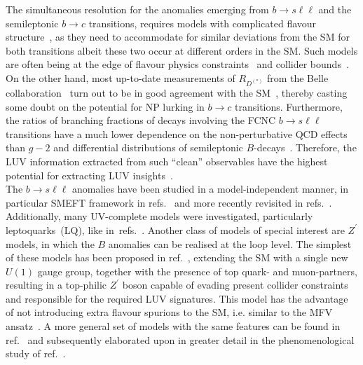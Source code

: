 The simultaneous resolution for the anomalies emerging from $ b \to s \ell \ell$ and the semileptonic $b \to c$ transitions, requires models with complicated flavour structure~\cite{DiLuzio:2017vat,Calibbi:2017qbu,Bordone:2017bld,Barbieri:2017tuq,Assad:2017iib,Heeck:2018ntp,Fornal:2018dqn,Crivellin:2018yvo,Crivellin:2019dwb,Bordone:2019uzc}, as they need to accommodate for similar deviations from the SM for both transitions albeit these two occur at different orders in the SM. Such models are often being at the edge of flavour physics constraints~\cite{Bona:2007vi,Silvestrini:2018dos} and collider bounds~\cite{Greljo:2017vvb,Baker:2019sli}.
On the other hand, most up-to-date measurements of $R_{D^{(*)}}$ from the Belle collaboration~\cite{Hirose:2016wfn,Abdesselam:2019dgh} turn out to be in good agreement with the SM~\cite{Bigi:2016mdz,Bernlochner:2017jka,Bigi:2017jbd,Jaiswal:2017rve}, thereby casting some doubt on the potential for NP lurking in $b\to c$ transitions. 
Furthermore, the ratios of branching fractions of decays involving the FCNC $b \to s \ell \ell$ transitions have a much lower dependence on the  non-perturbative QCD effects than $g-2$ and differential distributions of semileptonic $B$-decays~\cite{Capdevila:2016ivx,Serra:2016ivr,Wehle:2016yoi,Alguero:2019pjc}. Therefore, the LUV information extracted from such ``clean'' observables have the highest potential for extracting LUV insights~\cite{Kou:2018nap}.\\
The $ b \to s \ell \ell$ anomalies have been studied in a model-independent manner, in particular SMEFT framework in refs.~\cite{DAmico:2017mtc,Geng:2017svp,Capdevila:2017bsm,Ciuchini:2017mik,Hiller:2017bzc} and more recently revisited in refs.~\cite{Ciuchini:2019usw,Aebischer:2019mlg,Alok:2019ufo,Alguero:2019ptt,Kowalska:2019ley,Arbey:2019duh,Datta:2019zca}.  Additionally, many UV-complete models were investigated, particularly leptoquarks~(LQ), like in~refs.~\cite{Calibbi:2015kma,Dorsner:2016wpm,Buttazzo:2017ixm,Kumar:2018kmr,Cornella:2019hct}. Another class of models of special interest are $Z^\prime$ models, in which the $B$ anomalies can be realised at the loop level. The simplest of these models has been proposed in ref.~\cite{Kamenik:2017tnu}, extending the SM with a single new $U(1)$ gauge group, together with the presence of top quark- and muon-partners, resulting in a top-philic $Z^\prime$ boson capable of evading present collider constraints~\cite{Fox:2018ldq} and responsible for the required LUV signatures. This model has the advantage of not introducing extra flavour spurions to the SM, i.e. similar to the MFV ansatz~\cite{Buras:2000dm,DAmbrosio:2002vsn,Kagan:2009bn}.  A more general set of models with the same features can be found in ref.~\cite{Celis:2017doq} and subsequently elaborated upon in greater detail in the phenomenological study of ref.~\cite{Camargo-Molina:2018cwu}. \\
